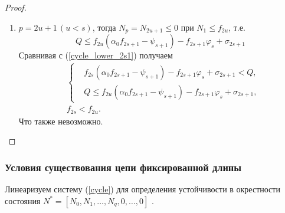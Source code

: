 \begin{proof}
\begin{enumerate}
\begin{enumerate}
                    \item \(p = 2u+1 \, (u < s)\), тогда \( N_p = N_{2u+1} \leq 0 \) при \(N_1 \leq f_{2u} \), т.е. 
                    \begin{equation*}
                        Q \leq f_{2u} ( \alpha_0 f_{2s+1} - \psi_{s+1} ) - f_{2s+1} \varphi_s + \sigma_{2s+1}
                    \end{equation*}
                    Сравнивая с (\ref{cycle_lower_2s1}) получаем
                    \begin{equation*}
                        \begin{split}
                        & \left\{ \begin{split}
                            & f_{2s} ( \alpha_0 f_{2s+1}  - \psi_{s+1} ) - f_{2s+1} \varphi_s + \sigma_{2s+1}
                            < Q, \\
                            & Q \leq f_{2u} ( \alpha_0 f_{2s+1} - \psi_{s+1} ) - f_{2s+1} \varphi_s + \sigma_{2s+1},
                        \end{split} \right. \\
                        & f_{2s} < f_{2u}.
                        \end{split}
                    \end{equation*}
                    Что также невозможно. 
                \end{enumerate}
            \end{enumerate}
        \end{proof}

    \subsubsection{Условия существования цепи фиксированной длины}

        Линеаризуем систему (\ref{cycle}) для определения устойчивости в окрестности состояния \(N^* = [ N_0, N_1, \dots, N_q, 0, \dots, 0 ]\) .

